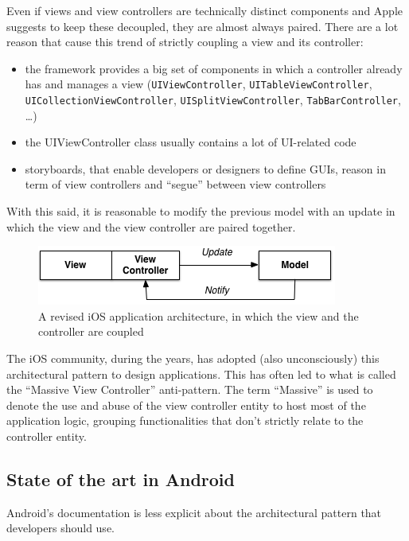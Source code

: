 Even if views and view controllers are technically distinct components
and Apple suggests to keep these decoupled, they are almost always
paired. There are a lot reason that cause this trend of strictly
coupling a view and its controller:

\begin{itemize}
\itemsep1pt\parskip0pt
\item
  the framework provides a big set of components in which a controller
  already has and manages a view (\texttt{UIViewController},
  \texttt{UITableViewController}, \texttt{UICollectionViewController},
  \texttt{UISplitViewController}, \texttt{TabBarController}, \ldots{})
\item
  the UIViewController class usually contains a lot of UI-related code
\item
  storyboards, that enable developers or designers to define GUIs,
  reason in term of view controllers and ``segue'' between view
  controllers
\end{itemize}

With this said, it is reasonable to modify the previous model with an
update in which the view and the view controller are paired together.

\begin{figure}[htbp]
\centering
\includegraphics[scale=0.75]{imgs/real_mvc.png}
\caption{A revised iOS application architecture, in which the view and
the controller are coupled}
\end{figure}

The iOS community, during the years, has adopted (also unconsciously)
this architectural pattern to design applications. This has often led
to what is called the ``Massive View Controller'' anti-pattern. The term
``Massive'' is used to denote the use and abuse of the view controller
entity to host most of the application logic, grouping functionalities
that don't strictly relate to the controller entity.

\subsection{State of the art in
Android}\label{state-of-the-art-in-android}

Android's documentation is less explicit about the architectural pattern
that developers should use.

